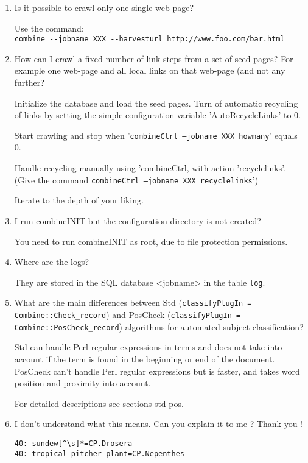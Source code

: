 \begin{enumerate}
\item Is it possible to crawl only one single web-page?

Use the command:\\
\verb+combine --jobname XXX --harvesturl http://www.foo.com/bar.html+

\item How can I crawl a fixed number of link steps from a set of seed
pages?
For example one web-page and all local links on that web-page (and not
any further?

Initialize the database and load the seed pages. Turn of automatic
recycling of links  by setting the simple configuration variable
'AutoRecycleLinks' to 0.


Start crawling and stop when '{\tt combineCtrl --jobname XXX howmany}'
equals 0.

Handle recycling manually using 'combineCtrl, with action 'recyclelinks'.
(Give the command {\tt combineCtrl --jobname XXX recyclelinks}')

Iterate to the depth of your liking.

\item I run combineINIT but the configuration directory is not
created?

You need to run combineINIT as root, due to file protection
permissions.

\item Where are the logs?

They are stored in the SQL database <jobname> in the table {\tt log}.

\item What are the main differences between Std ({\tt classifyPlugIn =
Combine::Check\_record}) and PosCheck ({\tt classifyPlugIn =
Combine::PosCheck\_record}) algorithms for automated subject
classification?

Std can handle Perl regular expressions in terms and does not
take into account if the term is found in the beginning or end of the document.
PosCheck can't handle Perl regular expressions but is faster, and takes word position and proximity into account.

For detailed descriptions see sections
\hyperref{Algorithm 1}{Algorithm 1 (}{)}{std}
\hyperref{Algorithm 2}{Algorithm 2 (}{)}{pos}.

\item I don't understand what this means. Can you explain it to me ? Thank you !

\begin{verbatim}
40: sundew[^\s]*=CP.Drosera
40: tropical pitcher plant=CP.Nepenthes
\end{verbatim}


\end{enumerate}
